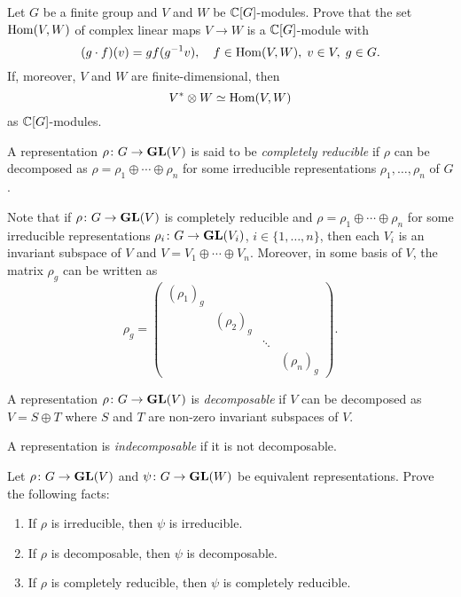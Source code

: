 \begin{exercise}
    Let $G$ be a finite group and
    $V$ and $W$ be $\mathbb{C}[G]$-modules. Prove that
    the set $\operatorname{Hom}(V,W)$ of complex linear maps $V\to W$ 
     is a $\mathbb{C}[G]$-module
    with
    \[
    (g\cdot f)(v)=gf(g^{-1}v),\quad
    f\in\operatorname{Hom}(V,W),\;v\in V,\;g\in G.
    \]
    If, moreover, $V$ and $W$ are finite-dimensional, then
    \[
    V^{*}\otimes W\simeq\operatorname{Hom}(V,W)
    \]
    as $\mathbb{C}[G]$-modules.
\end{exercise}



\begin{definition}
    A representation $\rho\colon G\to\mathbf{GL}(V)$ is said to be 
    \emph{completely reducible}
    if $\rho$ can be decomposed as
    $\rho=\rho_1\oplus\cdots\oplus \rho_n$ for some irreducible
    representations $\rho_1,\dots,\rho_n$ of $G$. 
\end{definition}

Note that if $\rho\colon G\to\mathbf{GL}(V)$ is completely reducible and 
$\rho=\rho_1\oplus\cdots\oplus \rho_n$ for some irreducible representations 
$\rho_i\colon G\to\mathbf{GL}(V_i)$, $i\in\{1,\dots,n\}$, then 
each $V_i$ is an invariant subspace of $V$ and $V=V_1\oplus \cdots\oplus V_n$. 
Moreover, in some basis of $V$, the matrix  
$\rho_g$ can be written as 
\[
\rho_g=\begin{pmatrix}
(\rho_1)_g &  \\
& (\rho_2)_g  \\
&&\ddots\\
&&&(\rho_n)_g	
\end{pmatrix}.
\]

\begin{definition}
A representation
$\rho\colon G\to\mathbf{GL}(V)$ is \emph{decomposable} if $V$ can be decomposed as $V=S\oplus T$
where $S$ and $T$ are non-zero invariant subspaces of $V$. 
\end{definition}

A representation is 
\emph{indecomposable} if it is not decomposable. 

\begin{exercise}
\label{xca:equivalence}
	Let $\rho\colon G\to\mathbf{GL}(V)$ and $\psi\colon G\to\mathbf{GL}(W)$ be equivalent representations.
	Prove the following facts:
	\begin{enumerate}
		\item If $\rho$ is irreducible, then $\psi$ is irreducible.
		\item If $\rho$ is decomposable, then $\psi$ is decomposable.
		\item If $\rho$ is completely reducible, then $\psi$ is completely reducible. 
	\end{enumerate}	
\end{exercise}


